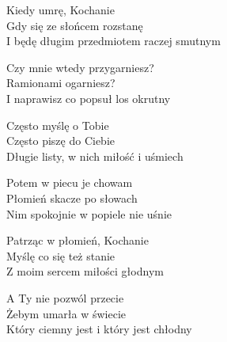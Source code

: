 \begin{text}
    Kiedy umrę, Kochanie\\
    Gdy się ze słońcem rozstanę\\
    I będę długim przedmiotem raczej smutnym

    Czy mnie wtedy przygarniesz?\\
    Ramionami ogarniesz?\\
    I naprawisz co popsuł los okrutny

    Często myślę o Tobie\\
    Często piszę do Ciebie\\
    Długie listy, w nich miłość i uśmiech

    Potem w piecu je chowam\\
    Płomień skacze po słowach\\
    Nim spokojnie w popiele nie uśnie

    Patrząc w płomień, Kochanie\\
    Myślę co się też stanie\\
    Z moim sercem miłości głodnym

    A Ty nie pozwól przecie\\
    Żebym umarła w świecie\\
    Który ciemny jest i który jest chłodny
\end{text}
\begin{chord}

\end{chord}